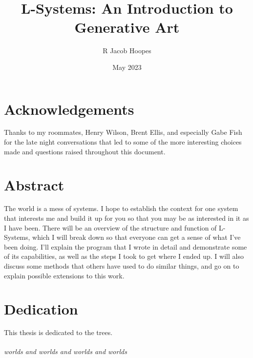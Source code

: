 \documentclass[12pt,twoside]{reedthesis}
\title{L-Systems: An Introduction to Generative Art} %
\author{R Jacob Hoopes}
\date{May 2023}
\begin{document}
  \maketitle
  \frontmatter %
  \pagestyle{empty} %

    \chapter*{Acknowledgements}
	Thanks to my roommates, Henry Wilson, Brent Ellis, and especially Gabe Fish for the late night conversations that led to some of the more interesting choices made and questions raised throughout this document.


    \tableofcontents

\chapter*{Abstract}
	The world is a mess of systems. I hope to establish the context for one system that interests me and build it up for you so that you may be as interested in it as I have been. There will be an overview of the structure and function of L-Systems, which I will break down so that everyone can get a sense of what I've been doing. I'll explain the program that I wrote in detail and demonstrate some of its capabilities, as well as the steps I took to get where I ended up. I will also discuss some methods that others have used to do similar things, and go on to explain possible extensions to this work.
	
\chapter*{Dedication}
	This thesis is dedicated to the trees. \\\\
	\textit{worlds and worlds and worlds and worlds}

  \mainmatter %
  \pagestyle{fancyplain} %
\end{document}
